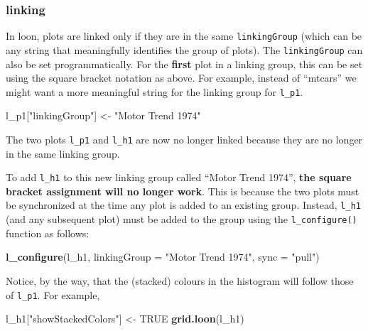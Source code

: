 \documentclass[]{article}
\newenvironment{Shaded}{\begin{snugshade}}{\end{snugshade}}
\newcommand{\KeywordTok}[1]{\textcolor[rgb]{0.13,0.29,0.53}{\textbf{#1}}}
\newcommand{\DataTypeTok}[1]{\textcolor[rgb]{0.13,0.29,0.53}{#1}}
\newcommand{\StringTok}[1]{\textcolor[rgb]{0.31,0.60,0.02}{#1}}
\newcommand{\OtherTok}[1]{\textcolor[rgb]{0.56,0.35,0.01}{#1}}
\newcommand{\NormalTok}[1]{#1}
\begin{document}
\subsubsection{linking}\label{linking-1}

In loon, plots are linked only if they are in the same
\texttt{linkingGroup} (which can be any string that meaningfully
identifies the group of plots). The \texttt{linkingGroup} can also be
set programmatically. For the \textbf{first} plot in a linking group,
this can be set using the square bracket notation as above. For example,
instead of ``mtcars'' we might want a more meaningful string for the
linking group for \texttt{l\_p1}.

\begin{Shaded}
\begin{Highlighting}[]
\NormalTok{l_p1[}\StringTok{"linkingGroup"}\NormalTok{] <-}\StringTok{ "Motor Trend 1974"}
\end{Highlighting}
\end{Shaded}

The two plots \texttt{l\_p1} and \texttt{l\_h1} are now no longer linked
because they are no longer in the same linking group.

To add \texttt{l\_h1} to this new linking group called ``Motor Trend
1974'', \textbf{the square bracket assignment will no longer work}. This
is because the two plots must be synchronized at the time any plot is
added to an existing group. Instead, \texttt{l\_h1} (and any subsequent
plot) must be added to the group using the \texttt{l\_configure()}
function as follows:

\begin{Shaded}
\begin{Highlighting}[]
\KeywordTok{l_configure}\NormalTok{(l_h1, }\DataTypeTok{linkingGroup =} \StringTok{"Motor Trend 1974"}\NormalTok{, }\DataTypeTok{sync =} \StringTok{"pull"}\NormalTok{)}
\end{Highlighting}
\end{Shaded}

Notice, by the way, that the (stacked) colours in the histogram will
follow those of \texttt{l\_p1}. For example,

\begin{Shaded}
\begin{Highlighting}[]
\NormalTok{l_h1[}\StringTok{"showStackedColors"}\NormalTok{] <-}\StringTok{ }\OtherTok{TRUE}
\KeywordTok{grid.loon}\NormalTok{(l_h1)}
\end{Highlighting}
\end{Shaded}
\end{document}
